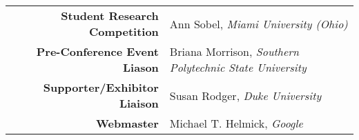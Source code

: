 {\begin{tabular}[l]{@{}rp{2.75in}}
	\textbf{Student Research Competition} & Ann Sobel, \emph{Miami University (Ohio)} \\

	\textbf{Pre-Conference Event Liason} & Briana Morrison, \emph{Southern Polytechnic State University} \\

	\textbf{Supporter/Exhibitor Liaison} & Susan Rodger, \emph{Duke University} \\

	\textbf{Webmaster} & Michael T. Helmick, \emph{Google} \\



\end{tabular}
}


